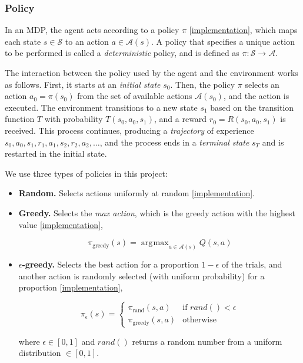 \documentclass{article}
\DeclareMathOperator*{\argmax}{\arg\!\max}
\newcommand{\GithubURL}[1]{[\href{https://github.com/davidrobles/mlnd-capstone-code/blob/master/#1}{implementation}]}
\begin{document}
\subsubsection{Policy}

In an MDP, the agent acts according to a policy $\pi$ \GithubURL{capstone/rl/policy.py}, which maps
each state $s \in \mathcal{S}$ to an action $a \in \mathcal{A}(s)$. A policy that specifies a unique
action to be performed is called a \emph{deterministic} policy, and is defined as $\pi : \mathcal{S}
\rightarrow \mathcal{A}$.

The interaction between the policy used by the agent and the environment works as follows. First, it
starts at an \emph{initial state} $s_0$. Then, the policy $\pi$ selects an action $a_0 = \pi(s_0)$
from the set of available actions $\mathcal{A}(s_0)$, and the action is executed. The environment
transitions to a new state $s_1$ based on the transition function $T$ with probability
$T(s_0,a_0,s_1)$, and a reward $r_0 = R(s_0, a_0, s_1)$ is received. This process continues,
producing a \emph{trajectory} of experience $s_0, a_0, s_1, r_1, a_1, s_2, r_2, a_2, \dots$, and the
process ends in a \emph{terminal state} $s_T$ and is restarted in the initial state.

We use three types of policies in this project:

\begin{itemize}

    \item \textbf{Random.} Selects actions uniformly at random
        \GithubURL{capstone/rl/policies/random_policy.py}.

    \item \textbf{Greedy.} Selects the \emph{max action}, which is the greedy
                           action with the highest value \GithubURL{capstone/rl/policies/greedy.py},

        \begin{equation}
            \pi_{\textrm{greedy}}(s) = \argmax_{a \in \mathcal{A}(s)} Q(s, a)
        \end{equation}

    \item \textbf{$\epsilon$-greedy.} Selects the best action for a proportion
        $1 - \epsilon$ of the trials, and another action is randomly selected (with
        uniform probability) for a proportion \GithubURL{capstone/rl/policies/egreedy.py},

        \begin{equation}
            \pi_{\epsilon}(s) = \left\{
             \begin{array}{lr}
                 \pi_{\textrm{rand}}(s,a) & \text{if } rand() < \epsilon\\
                 \pi_{\textrm{greedy}}(s,a) & \text{otherwise}
             \end{array}
           \right.
        \end{equation}

        where $\epsilon \in [0, 1]$ and $rand()$ returns a random number from a
        uniform distribution $\in [0, 1]$.

\end{itemize}
\end{document}
